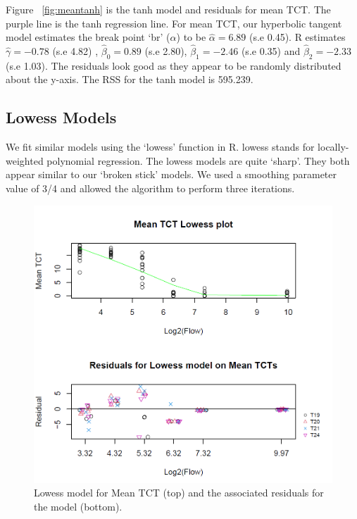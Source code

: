 Figure ~\ref{fig:meantanh} is the tanh model and residuals for mean TCT. The purple line is the tanh regression line. For mean TCT, our hyperbolic tangent model estimates the break point `br' ($\alpha$) to be $\hat\alpha=6.89$ (s.e 0.45). R estimates $\hat\gamma= -0.78$ (s.e 4.82) , $\hat\beta_{0}=0.89$ (s.e 2.80), $\hat\beta_{1}=-2.46$ (s.e 0.35) and $\hat\beta_{2}=-2.33$ (s.e 1.03). The residuals look good as they appear to be randomly distributed about the y-axis. The RSS for the tanh model is 595.239.


\subsection{Lowess Models}

We fit similar models using the `lowess' function in R. lowess stands for locally-weighted polynomial regression.
 The lowess models are quite `sharp'. They both appear similar to our `broken stick' models. We used a smoothing parameter value of 3/4 and allowed the algorithm to perform three iterations.



\begin{figure}[H]
\includegraphics[scale=0.7]{Chapter4Images/meantctlowess.png}
\caption{\hspace{1mm}Lowess model for Mean TCT (top) and the associated residuals for the model (bottom).}
\label{fig:meanlowess}
\end{figure}


